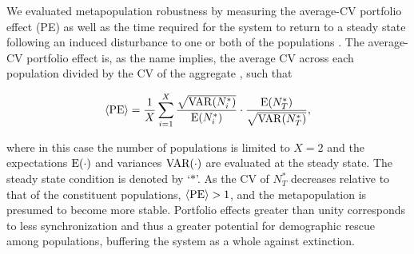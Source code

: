 \documentclass{revtex4}
\begin{document}


\noindent We evaluated metapopulation robustness by measuring the average-CV portfolio effect (PE) \citep{Anderson:2014cx,Schindler:2015gf} as well as the time required for the system to return to a steady state following an induced disturbance to one or both of the populations \citep{Ovaskainen:2002il}.
The average-CV portfolio effect is, as the name implies, the average CV across each population divided by the CV of the aggregate \citep{Anderson:2013gb}, such that


\begin{equation}
\langle{\rm PE}\rangle =\frac{1}{X}\sum_{i=1}^{X} \frac{\sqrt{{\rm VAR}(N_i^*)}}{{\rm E}(N_i^*)}\cdot \frac{{\rm E}(N_T^*)}{\sqrt{{\rm VAR}(N_T^*)}},
\label{eq:pe}
\end{equation}

\noindent where in this case the number of populations is limited to $X=2$ and the expectations $\rm E(\cdot)$ and variances $\rm VAR(\cdot)$ are evaluated at the steady state.
The steady state condition is denoted by `$*$'.
As the CV of $N_T^*$ decreases relative to that of the constituent populations, $\langle{\rm PE}\rangle > 1$, and the metapopulation is presumed to become more stable.
Portfolio effects greater than unity corresponds to less synchronization  \citep{Loreau:2008ju,Anderson:2014cx,Yeakel:2013vz} and thus a greater potential for demographic rescue among populations, buffering the system as a whole against extinction. 
\end{document}
